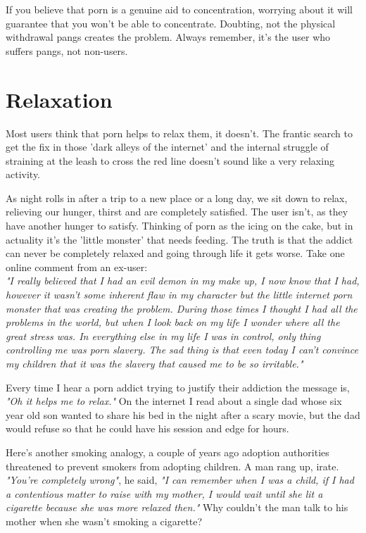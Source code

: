 \documentclass[easypeasy.tex]{subfiles}
\begin{document}
If you believe that porn is a genuine aid to concentration, worrying about it will guarantee that you won't be able to concentrate. Doubting, not the physical withdrawal pangs creates the problem. Always remember, it's the user who suffers pangs, not non-users.

\section{Relaxation}

Most users think that porn helps to relax them, it doesn't. The frantic search to get the fix in those 'dark alleys of the internet' and the internal struggle of straining at the leash to cross the red line doesn't sound like a very relaxing activity.

As night rolls in after a trip to a new place or a long day, we sit down to relax, relieving our hunger, thirst and are completely satisfied. The user isn't, as they have another hunger to satisfy. Thinking of porn as the icing on the cake, but in actuality it's the 'little monster' that needs feeding. The truth is that the addict can never be completely relaxed and going through life it gets worse. Take one online comment from an ex-user: \\
  \textit{"I really believed that I had an evil demon in my make up, I now know that I had, however it wasn't some inherent flaw in my character but the little internet porn monster that was creating the problem. During those times I thought I had all the problems in the world, but when I look back on my life I wonder where all the great stress was. In everything else in my life I was in control, only thing controlling me was porn slavery. The sad thing is that even today I can't convince my children that it was the slavery that caused me to be so irritable."}

Every time I hear a porn addict trying to justify their addiction the message is, \textit{"Oh it helps me to relax."} On the internet I read about a single dad whose six year old son wanted to share his bed in the night after a scary movie, but the dad would refuse so that he could have his session and edge for hours.

Here's another smoking analogy, a couple of years ago adoption authorities threatened to prevent smokers from adopting children. A man rang up, irate. \textit{"You're completely wrong"}, he said, \textit{"I can remember when I was a child, if I had a contentious matter to raise with my mother, I would wait until she lit a cigarette because she was more relaxed then."} Why couldn't the man talk to his mother when she wasn't smoking a cigarette?
\end{document}
